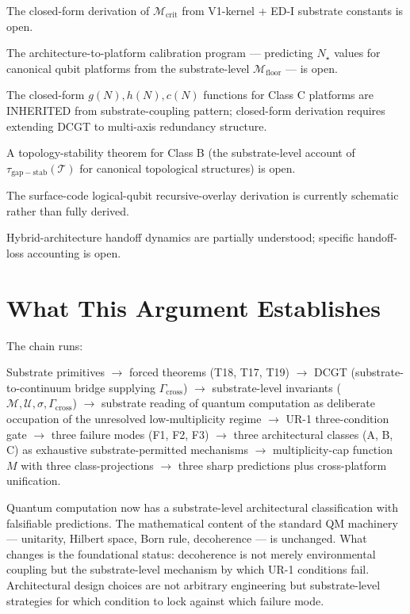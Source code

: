 \documentclass[11pt,a4paper]{article}
\begin{document}
The closed-form derivation of $\mathcal{M}_{\mathrm{crit}}$ from V1-kernel + ED-I substrate constants is open.

The architecture-to-platform calibration program --- predicting $N_\star$ values for canonical qubit platforms from the substrate-level $\mathcal{M}_{\mathrm{floor}}$ --- is open.

The closed-form $g(N), h(N), c(N)$ functions for Class C platforms are INHERITED from substrate-coupling pattern; closed-form derivation requires extending DCGT to multi-axis redundancy structure.

A topology-stability theorem for Class B (the substrate-level account of $\tau_{\mathrm{gap-stab}}(\mathcal{T})$ for canonical topological structures) is open.

The surface-code logical-qubit recursive-overlay derivation is currently schematic rather than fully derived.

Hybrid-architecture handoff dynamics are partially understood; specific handoff-loss accounting is open.

\section{What This Argument Establishes}

The chain runs:

Substrate primitives $\to$ forced theorems (T18, T17, T19) $\to$ DCGT (substrate-to-continuum bridge supplying $\Gamma_{\mathrm{cross}}$) $\to$ substrate-level invariants ($\mathcal{M}, \mathcal{U}, \sigma, \Gamma_{\mathrm{cross}}$) $\to$ substrate reading of quantum computation as deliberate occupation of the unresolved low-multiplicity regime $\to$ UR-1 three-condition gate $\to$ three failure modes (F1, F2, F3) $\to$ three architectural classes (A, B, C) as exhaustive substrate-permitted mechanisms $\to$ multiplicity-cap function $M$ with three class-projections $\to$ three sharp predictions plus cross-platform unification.

Quantum computation now has a substrate-level architectural classification with falsifiable predictions. The mathematical content of the standard QM machinery --- unitarity, Hilbert space, Born rule, decoherence --- is unchanged. What changes is the foundational status: decoherence is not merely environmental coupling but the substrate-level mechanism by which UR-1 conditions fail. Architectural design choices are not arbitrary engineering but substrate-level strategies for which condition to lock against which failure mode.
\end{document}
